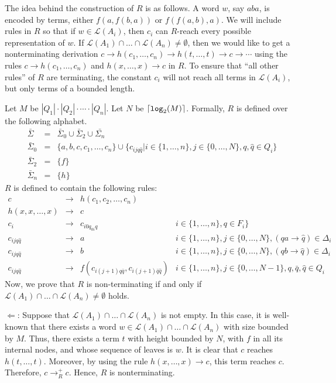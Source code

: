 \documentclass{LMCS}
\theoremstyle{plain}
\begin{document}
The idea behind the construction of $R$ is as follows.
A word $w$, say $aba$, is encoded by terms, either
$f(a,f(b,a))$ or $f(f(a,b),a)$.
We will include rules in $R$ so that if $w\in {\mathcal L}(A_i)$,
then $c_i$ can $R$-reach every possible representation of $w$.
If 
${\mathcal L}(A_1)\cap\ldots\cap{\mathcal L}(A_n)\not=\emptyset$,
then we would like to get a nonterminating derivation
$c \rightarrow h(c_1,\ldots,c_n) \rightarrow h(t,\ldots,t) 
\rightarrow c \rightarrow \cdots$ using the rules
$c \rightarrow h(c_1,\ldots,c_n)$ and 
$h(x,\ldots,x) \rightarrow c$ in $R$.
To ensure that ``all other rules'' of $R$ are terminating,
the constant $c_i$ will not reach all terms in ${\mathcal L}(A_i)$, but
only terms of a bounded length.

Let $M$ be $|Q_1|\cdot|Q_2|\cdot\cdots\cdot|Q_n|$.
Let $N$ be $\lceil {\tt log}_2(M)\rceil$.
Formally, $R$ is defined over the following alphabet.
$$
\begin{array}{rcl}
\bar{\Sigma}   &=&\bar{\Sigma}_0\cup\bar{\Sigma}_2\cup\bar{\Sigma_n}\\
\bar{\Sigma}_0 &=&\{a,b,c,c_1,\ldots,c_n\}\cup
               \{c_{ijq\hat{q}}|i\in\{1,\ldots,n\},j\in\{0,\ldots,N\},q,\hat{q}\in Q_i\}\\
\bar{\Sigma}_2 &=&\{f\}\\
\bar{\Sigma}_n &=&\{h\}
\end{array}
$$
$R$ is defined to contain the following rules:
$$
\begin{array}{rcll}
c&\to&h(c_1, c_2,\ldots, c_n)
\\
h(x,x,\ldots,x)&\to&c
\\
c_i &\to & c_{i0q_{0i}q} & i\in\{1,\ldots,n\},q\in F_i\}
\\
c_{ijq\hat{q}} & \to & a  & i\in\{1,\ldots,n\},j\in\{0,\ldots,N\},
(qa\to\hat{q})\in \Delta_i
\\
c_{ijq\hat{q}} & \to & b  & i\in\{1,\ldots,n\},j\in\{0,\ldots,N\},
(qb\to\hat{q})\in \Delta_i
\\
c_{ijq\hat{q}} & \to & f(c_{i(j+1)q\bar{q}},c_{i(j+1)\bar{q}\hat{q}})
&
i\in\{1,\ldots,n\},j\in\{0,\ldots,N-1\},q,\bar{q},\hat{q}\in
Q_i
\end{array}
$$
Now, we prove that
$R$ is non-terminating if and only if
${\mathcal L}(A_1)\cap\ldots\cap{\mathcal
L}(A_n)\not=\emptyset$ holds.


$\Leftarrow$:
Suppose that
${\mathcal L}(A_1)\cap\ldots\cap{\mathcal L}(A_n)$ is not empty.
In this case, it is well-known that
there exists a word 
$w\in{\mathcal L}(A_1)\cap\ldots\cap{\mathcal L}(A_n)$ 
with size bounded by $M$.
Thus, there exists a term $t$ with height bounded
by $N$, with $f$ in all its internal nodes, and
whose sequence of leaves is $w$.
It is clear that $c$ reaches
$h(t,\ldots,t)$.
Moreover, by using the rule $h(x,\ldots,x)\to c$,
this term reaches $c$. Therefore, $c\rightarrow_R^+ c$. 
Hence, $R$ is nonterminating.
\end{document}
